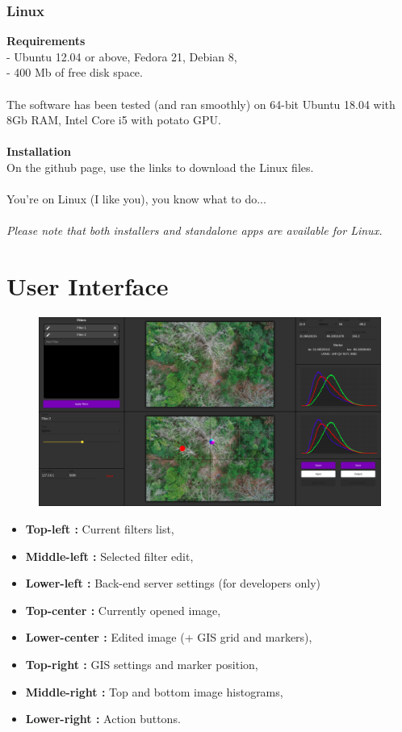 \documentclass[12pt,a4paper]{article}
\begin{document}
\section{Linux}
\textbf{Requirements}\\
- Ubuntu 12.04 or above, Fedora 21, Debian 8,\\
- 400 Mb of free disk space.\\
~\\
The software has been tested (and ran smoothly) on 64-bit Ubuntu 18.04 with 8Gb RAM, Intel Core i5 with potato GPU.\\
~\\
\textbf{Installation}\\
On the github page, use the links to download the Linux files.\\
~\\
You're on Linux (I like you), you know what to do...\\
~\\
\textit{Please note that both installers and standalone apps are available for Linux.}

\pagebreak

\part{User Interface}
\setcounter{section}{0}

\begin{figure}[H]
	\includegraphics[scale=0.25]{user_interface}
	\centering
\end{figure}

\begin{itemize}
	\item \textbf{Top-left :} Current filters list,
	\item \textbf{Middle-left :} Selected filter edit,
	\item \textbf{Lower-left :} Back-end server settings (for developers only)
	\item \textbf{Top-center :} Currently opened image,
	\item \textbf{Lower-center :} Edited image (+ GIS grid and markers),
	\item \textbf{Top-right :} GIS settings and marker position,
	\item \textbf{Middle-right :} Top and bottom image histograms,
	\item \textbf{Lower-right :} Action buttons.
\end{itemize}
\end{document}
